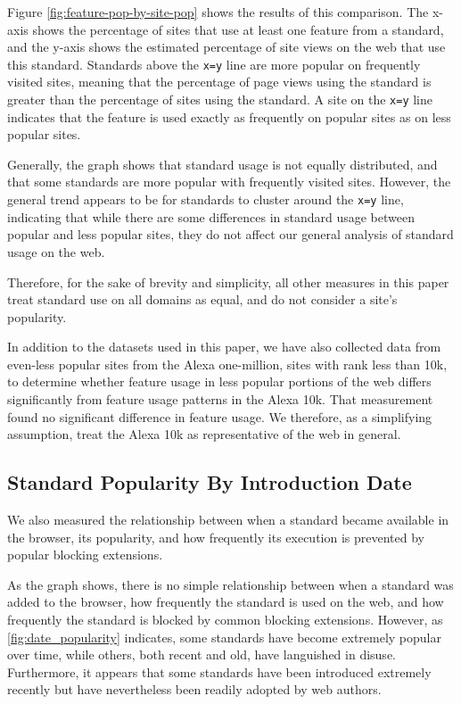 Figure \ref{fig:feature-pop-by-site-pop} shows the results of this comparison.
The x-axis shows the percentage of sites that use at least one
feature from a standard, and the y-axis shows the estimated percentage of
site views on the web that use this standard.  Standards above the
\texttt{x=y} line are more popular on frequently visited
sites, meaning that the percentage of page views using the standard is greater
than the percentage of sites using the standard.  A site on the \texttt{x=y}
line indicates that the feature is used exactly as frequently on popular sites
as on less popular sites.

Generally, the graph shows that standard usage is not equally distributed, and
that some standards are more popular with frequently visited sites.
However, the general trend appears to be for standards to
cluster around the \texttt{x=y} line, indicating that while there are some
differences in standard usage between popular and less popular sites, they do
not affect our general analysis of standard usage on the web.

Therefore, for the sake of brevity and simplicity, all other measures in this
paper treat standard use on all domains as equal, and do not consider a site's
popularity.

In addition to the datasets used in this paper, we have also collected data from
even-less popular sites from the Alexa one-million,
sites with rank less than 10k, to
determine whether feature usage in less popular portions of the web differs
significantly from feature usage patterns in the Alexa 10k.  That measurement found
no significant difference in feature usage.  We therefore, as a simplifying
assumption, treat the Alexa 10k as representative of the web
in general.



\subsection{Standard Popularity By Introduction Date}

We also measured the relationship between when a standard became
available in the browser, its popularity, and how frequently its execution is
prevented by popular blocking extensions.

As the graph shows, there is no simple relationship between when a standard
was added to the browser, how frequently the standard is used on the web, and how frequently the standard is blocked by common blocking
extensions.  However, as \ref{fig:date_popularity} indicates, some standards
have become extremely popular over time, while others, both recent and old,
have languished in disuse. Furthermore, it appears that some standards have been
introduced extremely recently but have nevertheless been readily adopted by web authors.

